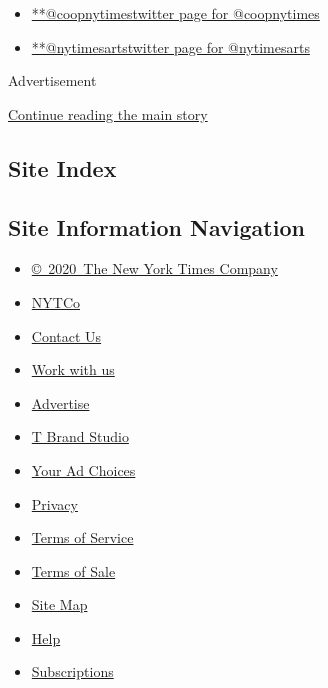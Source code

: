 \begin{itemize}
\tightlist
\item
  \href{https://twitter.com/coopnytimes}{**@coopnytimestwitter page for
  @coopnytimes}
\item
  \href{https://twitter.com/nytimesarts}{**@nytimesartstwitter page for
  @nytimesarts}
\end{itemize}

Advertisement

\protect\hyperlink{after-mktg}{Continue reading the main story}

\hypertarget{site-index}{%
\subsection{Site Index}\label{site-index}}

\hypertarget{site-information-navigation}{%
\subsection{Site Information
Navigation}\label{site-information-navigation}}

\begin{itemize}
\tightlist
\item
  \href{https://help.nytimes3xbfgragh.onion/hc/en-us/articles/115014792127-Copyright-notice}{©~2020~The
  New York Times Company}
\end{itemize}

\begin{itemize}
\tightlist
\item
  \href{https://www.nytco.com/}{NYTCo}
\item
  \href{https://help.nytimes3xbfgragh.onion/hc/en-us/articles/115015385887-Contact-Us}{Contact
  Us}
\item
  \href{https://www.nytco.com/careers/}{Work with us}
\item
  \href{https://nytmediakit.com/}{Advertise}
\item
  \href{http://www.tbrandstudio.com/}{T Brand Studio}
\item
  \href{https://www.nytimes3xbfgragh.onion/privacy/cookie-policy\#how-do-i-manage-trackers}{Your
  Ad Choices}
\item
  \href{https://www.nytimes3xbfgragh.onion/privacy}{Privacy}
\item
  \href{https://help.nytimes3xbfgragh.onion/hc/en-us/articles/115014893428-Terms-of-service}{Terms
  of Service}
\item
  \href{https://help.nytimes3xbfgragh.onion/hc/en-us/articles/115014893968-Terms-of-sale}{Terms
  of Sale}
\item
  \href{https://spiderbites.nytimes3xbfgragh.onion}{Site Map}
\item
  \href{https://help.nytimes3xbfgragh.onion/hc/en-us}{Help}
\item
  \href{https://www.nytimes3xbfgragh.onion/subscription?campaignId=37WXW}{Subscriptions}
\end{itemize}
